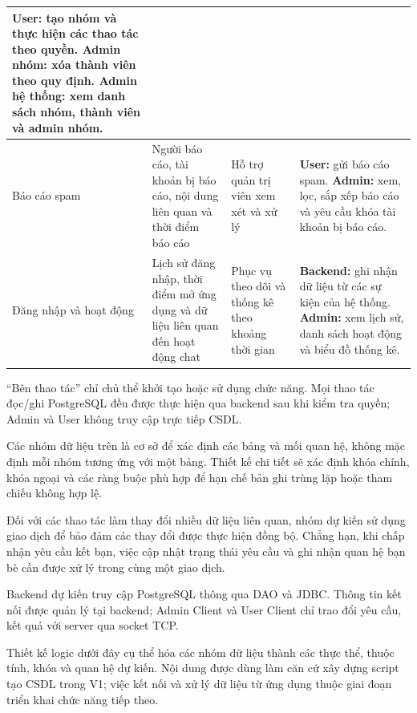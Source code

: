 \begin{longtable}{|L{2cm}|L{4cm}|L{3cm}|L{\dimexpr\textwidth-9cm-8\arrayrulewidth\relax}|}
  \textbf{User:} tạo nhóm và thực hiện các thao tác theo quyền.
  \textbf{Admin nhóm:} xóa thành viên theo quy định.
  \textbf{Admin hệ thống:} xem danh sách nhóm, thành viên và admin nhóm.\\
  \hline
  Báo cáo spam &
  Người báo cáo, tài khoản bị báo cáo, nội dung liên quan và thời điểm báo cáo &
  Hỗ trợ quản trị viên xem xét và xử lý &
  \textbf{User:} gửi báo cáo spam.
  \textbf{Admin:} xem, lọc, sắp xếp báo cáo và yêu cầu khóa tài khoản bị báo cáo.\\
  \hline
  Đăng nhập và hoạt động &
  Lịch sử đăng nhập, thời điểm mở ứng dụng và dữ liệu liên quan đến hoạt động chat &
  Phục vụ theo dõi và thống kê theo khoảng thời gian &
  \textbf{Backend:} ghi nhận dữ liệu từ các sự kiện của hệ thống.
  \textbf{Admin:} xem lịch sử, danh sách hoạt động và biểu đồ thống kê.\\
  \hline
\end{longtable}
\endgroup

``Bên thao tác'' chỉ chủ thể khởi tạo hoặc sử dụng chức năng. Mọi thao tác
đọc/ghi PostgreSQL đều được thực hiện qua backend sau khi kiểm tra quyền;
Admin và User không truy cập trực tiếp CSDL.

Các nhóm dữ liệu trên là cơ sở để xác định các bảng và mối quan hệ,
không mặc định mỗi nhóm tương ứng với một bảng. Thiết kế chi tiết sẽ xác định
khóa chính, khóa ngoại và các ràng buộc phù hợp để hạn chế bản ghi trùng lặp
hoặc tham chiếu không hợp lệ.

Đối với các thao tác làm thay đổi nhiều dữ liệu liên quan, nhóm dự kiến sử dụng
giao dịch để bảo đảm các thay đổi được thực hiện đồng bộ. Chẳng hạn, khi
chấp nhận yêu cầu kết bạn, việc cập nhật trạng thái yêu cầu và ghi nhận
quan hệ bạn bè cần được xử lý trong cùng một giao dịch.

Backend dự kiến truy cập PostgreSQL thông qua DAO và JDBC. Thông tin kết nối
được quản lý tại backend; Admin Client và User Client chỉ trao đổi yêu cầu,
kết quả với server qua socket TCP.

Thiết kế logic dưới đây cụ thể hóa các nhóm dữ liệu thành các thực thể,
thuộc tính, khóa và quan hệ dự kiến. Nội dung được dùng làm căn cứ xây dựng
script tạo CSDL trong V1; việc kết nối và xử lý dữ liệu từ ứng dụng thuộc
giai đoạn triển khai chức năng tiếp theo.




